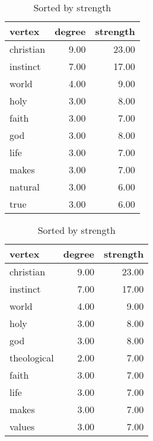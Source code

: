 \documentclass[letterpaper, 10 pt, conference]{article}
\begin{document}
\begin{table}
	\caption{Highest degree and strength vertices for largest connected component in the network.}
	\begin{subtable}{0.45\textwidth}
		\centering
		\caption{Sorted by degree.}
		\centering
		\begin{tabular}{lrr}
			\hline
			vertex & degree & strength \\ 
			\hline
			christian & 9.00 & 23.00 \\ 
			instinct & 7.00 & 17.00 \\ 
			world & 4.00 & 9.00 \\ 
			holy & 3.00 & 8.00 \\ 
			faith & 3.00 & 7.00 \\ 
			god & 3.00 & 8.00 \\ 
			life & 3.00 & 7.00 \\ 
			makes & 3.00 & 7.00 \\ 
			natural & 3.00 & 6.00 \\ 
			true & 3.00 & 6.00 \\ 
			\hline
		\end{tabular}
	\end{subtable}
	\hfill
	\begin{subtable}{0.45\textwidth}
		\centering
		\caption{Sorted by strength}
			\centering
			\begin{tabular}{lrr}
				\hline
				vertex & degree & strength \\ 
				\hline
				christian & 9.00 & 23.00 \\ 
				instinct & 7.00 & 17.00 \\ 
				world & 4.00 & 9.00 \\ 
				holy & 3.00 & 8.00 \\ 
				god & 3.00 & 8.00 \\ 
				theological & 2.00 & 7.00 \\ 
				faith & 3.00 & 7.00 \\ 
				life & 3.00 & 7.00 \\ 
				makes & 3.00 & 7.00 \\ 
				values & 3.00 & 7.00 \\ 
				\hline
			\end{tabular}
	\end{subtable}
	\label{tab:degree-strength}
\end{table}
\end{document}
